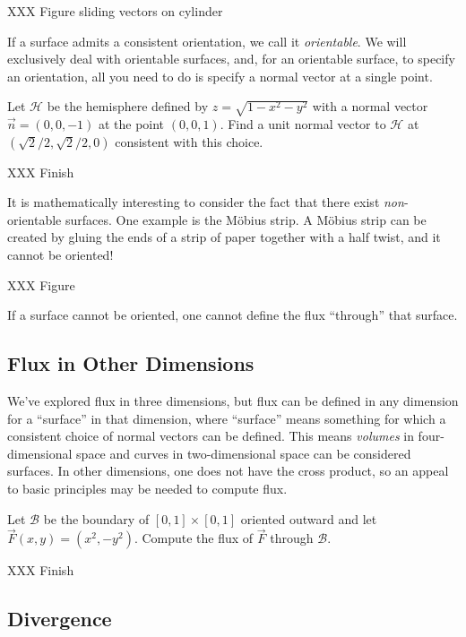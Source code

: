 XXX Figure sliding vectors on cylinder

If a surface admits a consistent orientation, we call it \emph{orientable}.
We will exclusively deal with orientable surfaces, and, for an orientable surface,
to specify an orientation, all you need to do is specify a normal vector at a single point.

\begin{example}
	Let $\mathcal H$ be the hemisphere defined by $z=\sqrt{1 - x^2 - y^2}$ with
	a normal vector $\vec n=(0,0,-1)$ at the point $(0,0,1)$.  Find a unit normal
	vector to $\mathcal H$ at $(\sqrt{2}/2,\sqrt{2}/2,0)$ consistent with this choice.

	XXX Finish
\end{example}

It is mathematically interesting to consider the fact that there exist \emph{non}-orientable
surfaces.  One example is the M\"obius strip.  A M\"obius strip can be created by gluing the
ends of a strip of paper together with a half twist, and it cannot be oriented!

XXX Figure

If a surface cannot be oriented, one cannot define the flux ``through'' that surface.

\subsection{Flux in Other Dimensions}

We've explored flux in three dimensions, but flux can be defined in any dimension
for a ``surface'' in that dimension, where ``surface'' means something for which a
consistent choice of normal vectors can be defined.  This means \emph{volumes} in four-dimensional
space  and curves in two-dimensional space can be considered surfaces.  In other dimensions,
one does not have the cross product, so an appeal to basic principles may be needed to compute
flux.

\begin{example}
	Let $\mathcal B$ be the boundary of $[0,1]\times[0,1]$
	oriented outward and let $\vec F(x,y)=(x^2,-y^2)$.  Compute the flux of $\vec F$
	through $\mathcal B$.

	XXX Finish
	
\end{example}


\subsection{Divergence}

